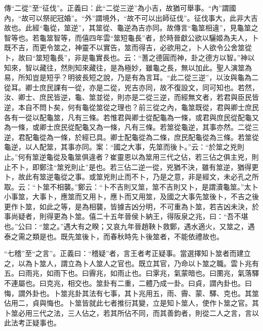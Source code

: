 {\noindent\zhuan{}\fzbyks 傳“二從”至“征伐”。正義曰：此“二從三逆”為小吉，故猶可舉事。“內”謂國內，“故可以祭祀冠婚”。“外”謂境外，“故不可以出師征伐”。征伐事大，此非大吉故也。此經“龜從，筮逆”，其筮從、龜逆為吉亦同。故傳言“龜筮相違”，見龜筮之智等也。若龜筮智等，而僖四年雲“筮短龜長”者，於時晉獻公欲以驪姬為夫人，卜既不吉，而更令筮之，神靈不以實告，筮而得吉，必欲用之，卜人欲令公舍筮從卜，故曰“筮短龜長”，非是龜實長也。云：“蓍之德圓而神，卦之德方以智。”神以知來，智以藏往，然則知來藏往，是為極妙，雖龜之長，無以加此。聖人演筮為易，所知豈是短乎？明彼長短之說，乃是有為言耳。“此二從三逆”，以汝與龜為二從耳。卿士庶民課有一從，亦是二從，兇吉亦同，故不復設文，同可知也。若然，汝、卿士、庶民皆逆，龜、筮並從，則亦是二從三逆，而經無文者，若君與臣民皆逆，本自不問卜矣，何有龜從筮從之理也？前三從之內，龜筮既從，君與卿士庶民各有一從以配龜筮，凡有三條。若惟君與卿士從配龜為一條，或君與庶民從配龜又為一條，或卿士庶民從配龜又為一條，凡有三條。若筮從龜逆，其事亦然。二從三逆，君配龜從為一條，於經已具。卿士配龜從為二條，庶民配龜從為三條。若筮從龜逆，以人配筮，其事亦同。案：“國之大事，先筮而後卜。”云：“於筮之兇則止。”何有筮逆龜從及龜筮俱違者？崔靈恩以為筮用三代之佔，若三佔之俱主兇，則止不卜，即鄭注“筮兇則止”是也。若三佔二逆一從，兇猶不決，雖有筮逆，猶得更卜，故此有筮逆龜從之事。或筮兇則止而不卜，乃是之意，非是經文，未必孔之所取。云：“卜筮不相襲。”鄭云：“卜不吉則又筮，筮不吉則又卜，是謂瀆龜筮。”太卜小事筮，大事卜，應筮而又用卜，應卜而又用筮，及國之大事先筮後卜，不吉之後更作卜筮，如此之等，是為相襲，皆據吉凶分明，不可重為卜筮，若吉凶未決，於事尚疑者，則得更為卜筮。僖二十五年晉侯卜納王，得阪泉之兆，曰：“吾不堪也。”公曰：“筮之。”遇大有之睽；又哀九年晉趙鞅卜救鄭，遇水適火，又筮之，遇泰之需之類是也。既先筮後卜，而春秋時先卜後筮者，不能依禮故也。 \par}

{\noindent\shu{}\fzkt “七稽”至“之言”。正義曰：“稽疑”者，言王者考正疑事。當選擇知卜筮者而建立之，以為卜筮人，謂立為卜人筮人之官也。既立其官，乃命以卜筮之職。雲卜兆有五。曰雨兆，如雨下也。曰霽兆，如雨止也。曰雺兆，氣蒙暗也。曰圛兆，氣落驛不連屬也。曰克兆，相交也。筮卦有二重，二體乃成一卦。曰貞，謂內卦也。曰悔，謂外卦也。卜筮兆卦其法有七事，其卜兆用五，雨、霽、蒙、驛、克也。其筮佔用二，貞與悔也。卜筮皆就此七者推衍其變，立是知卜筮人，使作卜筮之官。其卜筮必用三代之法，三人佔之，若其所佔不同，而其善鈞者，則從二人之言，言以此法考正疑事也。 \par}

